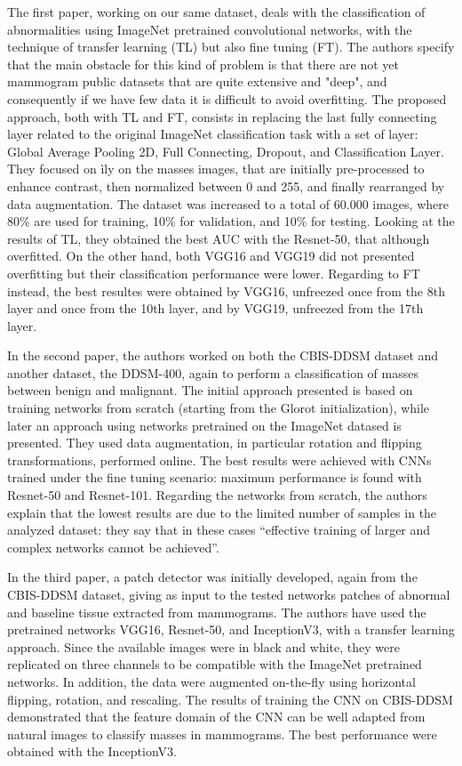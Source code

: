 \documentclass[11pt,a4paper,oneside]{article}
\begin{document}
The first paper, working on our same dataset, deals with the classification of abnormalities using ImageNet pretrained convolutional networks, with the technique of transfer learning (TL) but also fine tuning (FT). The authors specify that the main obstacle for this kind of problem is that there are not yet mammogram public datasets that are quite extensive and "deep", and consequently if we have few data it is difficult to avoid overfitting. The proposed approach, both with TL and FT, consists in replacing the last fully connecting layer related to the original ImageNet classification task with a set of layer: Global Average Pooling 2D, Full Connecting, Dropout, and Classification Layer. They focused on ìly on the masses images, that are initially pre-processed to enhance contrast, then normalized between 0 and 255, and finally rearranged by data augmentation. The dataset was increased to a total of 60.000 images, where 80\% are used for training, 10\% for validation, and 10\% for testing. Looking at the results of TL, they obtained the best AUC with the Resnet-50, that although overfitted. On the other hand, both VGG16 and VGG19 did not presented overfitting but their classification performance were lower. Regarding to FT instead, the best resultes were obtained by VGG16, unfreezed once from the 8th layer and once from the 10th layer, and by VGG19, unfreezed from the 17th layer.

In the second paper, the authors worked on both the CBIS-DDSM dataset and another dataset, the DDSM-400, again to perform a classification of masses between benign and malignant. The initial approach presented is based on training networks from scratch (starting from the Glorot initialization), while later an approach using networks pretrained on the ImageNet datased is presented. They used data augmentation, in particular rotation and flipping transformations, performed online. 
The best results were achieved with CNNs trained under the fine tuning scenario: maximum performance is found with Resnet-50 and Resnet-101. Regarding the networks from scratch, the authors explain that the lowest results are due to the limited number of samples in the analyzed dataset: they say that in these cases \enquote{effective training of larger and complex networks cannot be achieved}.

In the third paper, a patch detector was initially developed, again from the CBIS-DDSM dataset, giving as input to the tested networks patches of abnormal and baseline tissue extracted from mammograms. The authors have used the pretrained networks VGG16, Resnet-50, and InceptionV3, with a transfer learning approach. Since the available images were in black and white, they were replicated on three channels to be compatible with the ImageNet pretrained networks. In addition, the data were augmented on-the-fly using horizontal flipping, rotation, and rescaling. The results of training the CNN on CBIS-DDSM demonstrated that the feature domain of the CNN can be well adapted from natural images to classify masses in mammograms. The best performance were obtained with the InceptionV3.
\end{document}
